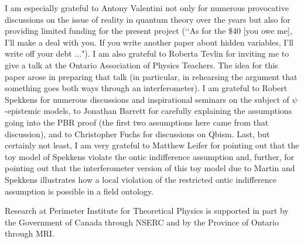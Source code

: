 \documentclass[12pt]{article}
\begin{document}
I am especially grateful to Antony Valentini not only for numerous provocative discussions on the issue of reality in quantum theory over the years but also for providing limited funding
for the present project (\lq\lq As for the \$40 [you owe me], I'll make a deal with you. If you write another paper about hidden variables, I'll write off your debt ...").  I am also
grateful to Roberta Tevlin for inviting me to give a talk at the Ontario Association of Physics Teachers.  The idea for this paper arose in preparing that talk (in particular, in rehearsing
the argument that something goes both ways through an interferometer).  I am grateful to Robert Spekkens for numerous discussions and inspirational seminars on the subject of
$\psi$-epistemic models, to Jonathan Barrett for carefully explaining the assumptions going into the PBR proof (the first two assumptions here came from that discussion), and to Christopher Fuchs for discussions on Qbism.  Last, but certainly not least, I am very grateful to Matthew Leifer for pointing out that the toy model of Spekkens violate the ontic indifference assumption and, further, for pointing out that the interferometer version of this toy model due to Martin and Spekkens illustrates how a local violation of the restricted ontic indifference assumption is possible in a field ontology.  

Research at Perimeter Institute for Theoretical Physics is supported in part by the Government of Canada through NSERC and by the Province of Ontario through MRI.

\raggedright

 
\end{document}

